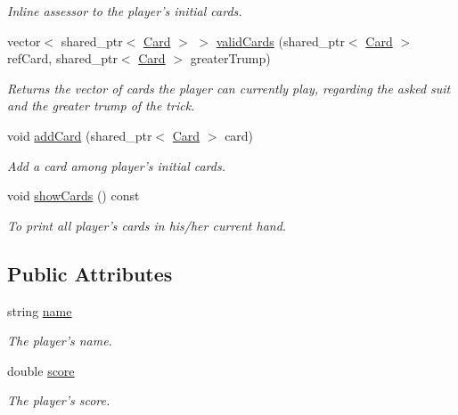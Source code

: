 \begin{DoxyCompactItemize}
\begin{DoxyCompactList}\small\item\em \-Inline assessor to the player's initial cards. \end{DoxyCompactList}\item 
vector$<$ shared\-\_\-ptr$<$ \hyperlink{classCard}{\-Card} $>$ $>$ \hyperlink{classPlayer_ab89873d894a8e4e7e67a16feba4bf116}{valid\-Cards} (shared\-\_\-ptr$<$ \hyperlink{classCard}{\-Card} $>$ ref\-Card, shared\-\_\-ptr$<$ \hyperlink{classCard}{\-Card} $>$ greater\-Trump)
\begin{DoxyCompactList}\small\item\em \-Returns the vector of cards the player can currently play, regarding the asked suit and the greater trump of the trick. \end{DoxyCompactList}\item 
void \hyperlink{classPlayer_a7c7b8325247c91ef255ca493de9f35eb}{add\-Card} (shared\-\_\-ptr$<$ \hyperlink{classCard}{\-Card} $>$ card)
\begin{DoxyCompactList}\small\item\em \-Add a card among player's initial cards. \end{DoxyCompactList}\item 
\hypertarget{classPlayer_a5216f487067dd79371af457f4b8f1769}{void \hyperlink{classPlayer_a5216f487067dd79371af457f4b8f1769}{show\-Cards} () const }\label{classPlayer_a5216f487067dd79371af457f4b8f1769}

\begin{DoxyCompactList}\small\item\em \-To print all player's cards in his/her current hand. \end{DoxyCompactList}\end{DoxyCompactItemize}
\subsection*{\-Public \-Attributes}
\begin{DoxyCompactItemize}
\item 
\hypertarget{classPlayer_acf0355128a99ee20ad9931b760fb2de1}{string \hyperlink{classPlayer_acf0355128a99ee20ad9931b760fb2de1}{name}}\label{classPlayer_acf0355128a99ee20ad9931b760fb2de1}

\begin{DoxyCompactList}\small\item\em \-The player's name. \end{DoxyCompactList}\item 
\hypertarget{classPlayer_a55f7b5b674245c2e09f3c191a54d3542}{double \hyperlink{classPlayer_a55f7b5b674245c2e09f3c191a54d3542}{score}}\label{classPlayer_a55f7b5b674245c2e09f3c191a54d3542}

\begin{DoxyCompactList}\small\item\em \-The player's score. \end{DoxyCompactList}\end{DoxyCompactItemize}
